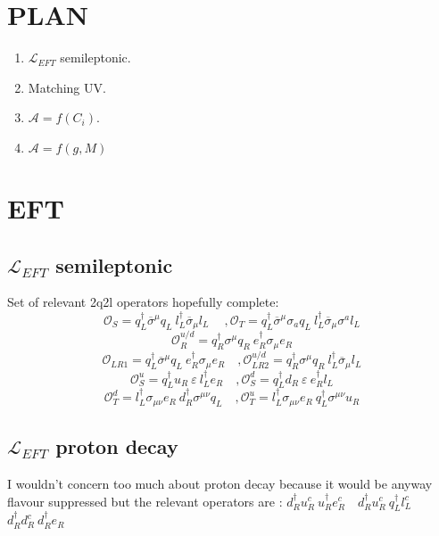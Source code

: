 \documentclass{article}
\begin{document}
\section{PLAN}
\begin{enumerate}
\item $\mathcal{L}_{EFT}$ semileptonic.
\item Matching UV.
\item $\mathcal{A}=f(C_i)$.
\item $\mathcal{A}=f(g,M)$
\end{enumerate}
\section{EFT}
\subsection{$\mathcal{L}_{EFT}$ semileptonic}
Set of relevant 2q2l operators hopefully complete:
\[ %
\mathcal{O}_S= q_L^\dagger \overline{\sigma}^\mu q_L \ l_L^\dagger \overline{\sigma}_\mu l_L \  \quad,\mathcal{O}_T=q_L^\dagger \overline{\sigma}^\mu  \sigma_a q_L \ l_L^\dagger \overline{\sigma}_\mu \sigma^a l_L
\]
\[ %
\mathcal{O}^{u/d}_R = q_R^\dagger \sigma^\mu q_R \ e_R^\dagger \sigma_\mu e_R 
\]
\[ %
\mathcal{O}_{LR1}= q_L^\dagger \overline{\sigma}^\mu q_L \ e_R^\dagger \sigma_\mu e_R \quad, \mathcal{O}_{LR2}^{u/d}= q_R^\dagger \sigma^\mu q_R \ l_L^\dagger \overline{\sigma}_\mu l_L 
\]
\[
\mathcal{O}^u_S = q_L^\dagger u_R \ \varepsilon \ l_L^\dagger e_R \quad, \mathcal{O}^d_{S}= q_L^\dagger d_R \ \varepsilon \ e_R^\dagger l_L 
\]
\[
\mathcal{O}_T^d = l_L^\dagger \sigma_{\mu \nu} e_R  \ d_R^\dagger \sigma^{\mu \nu} q_L \quad, \mathcal{O}_T^u = l_L^\dagger \sigma_{\mu \nu} e_R  \ q_L^\dagger \sigma^{\mu \nu} u_R
\]
\subsection{$\mathcal{L}_{EFT}$ proton decay}
I wouldn't concern too much about proton decay because it would be anyway flavour suppressed but the relevant operators are : $ d_R^\dagger u_R^c \ u_R^\dagger e_R^c \quad  d_R^\dagger u_R^c \ q_L^\dagger l_L^c $ $ d_R^\dagger d_R^c \ d_R^\dagger e_R $
\end{document}
